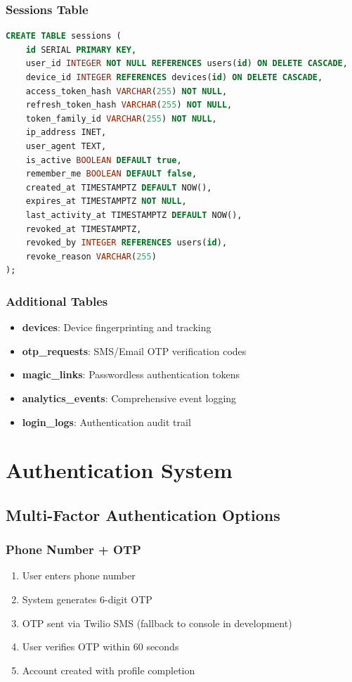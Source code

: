 \documentclass[12pt,a4paper]{article}
\begin{document}
\subsubsection{Sessions Table}
\begin{lstlisting}[language=sql]
CREATE TABLE sessions (
    id SERIAL PRIMARY KEY,
    user_id INTEGER NOT NULL REFERENCES users(id) ON DELETE CASCADE,
    device_id INTEGER REFERENCES devices(id) ON DELETE CASCADE,
    access_token_hash VARCHAR(255) NOT NULL,
    refresh_token_hash VARCHAR(255) NOT NULL,
    token_family_id VARCHAR(255) NOT NULL,
    ip_address INET,
    user_agent TEXT,
    is_active BOOLEAN DEFAULT true,
    remember_me BOOLEAN DEFAULT false,
    created_at TIMESTAMPTZ DEFAULT NOW(),
    expires_at TIMESTAMPTZ NOT NULL,
    last_activity_at TIMESTAMPTZ DEFAULT NOW(),
    revoked_at TIMESTAMPTZ,
    revoked_by INTEGER REFERENCES users(id),
    revoke_reason VARCHAR(255)
);
\end{lstlisting}

\subsubsection{Additional Tables}
\begin{itemize}
    \item \textbf{devices}: Device fingerprinting and tracking
    \item \textbf{otp\_requests}: SMS/Email OTP verification codes
    \item \textbf{magic\_links}: Passwordless authentication tokens
    \item \textbf{analytics\_events}: Comprehensive event logging
    \item \textbf{login\_logs}: Authentication audit trail
\end{itemize}

\section{Authentication System}

\subsection{Multi-Factor Authentication Options}

\subsubsection{Phone Number + OTP}
\begin{enumerate}
    \item User enters phone number
    \item System generates 6-digit OTP
    \item OTP sent via Twilio SMS (fallback to console in development)
    \item User verifies OTP within 60 seconds
    \item Account created with profile completion
\end{enumerate}
\end{document}
